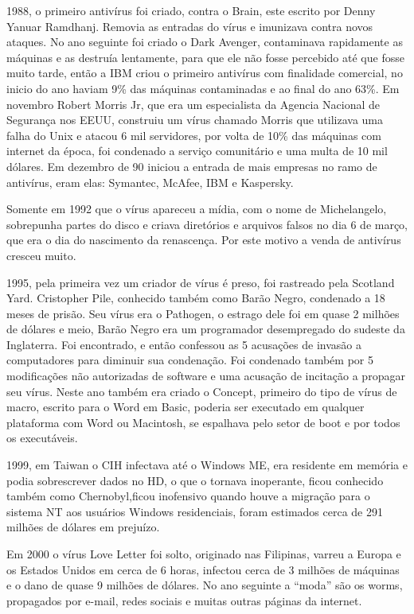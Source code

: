	1988, o primeiro antivírus foi criado, contra o Brain, este escrito por Denny Yanuar Ramdhanj. Removia as entradas do vírus e imunizava contra novos ataques. No ano seguinte foi criado o Dark Avenger, contaminava rapidamente as máquinas e as destruía lentamente, para que ele não fosse percebido até que fosse muito tarde, então a IBM criou o primeiro antivírus com finalidade comercial, no inicio do ano haviam 9\% das máquinas contaminadas e ao final do ano 63\%. Em novembro Robert Morris Jr, que era um especialista da Agencia Nacional de Segurança nos EEUU, construiu um vírus chamado Morris que utilizava uma falha do Unix e atacou 6 mil servidores, por volta de 10\% das máquinas com internet da época, foi condenado a serviço comunitário e uma multa de 10 mil dólares. Em dezembro de 90 iniciou a entrada de mais empresas no ramo de antivírus, eram elas: Symantec, McAfee, IBM e Kaspersky.


	Somente em 1992 que o vírus apareceu a mídia, com o nome de Michelangelo, sobrepunha partes do disco e criava diretórios e arquivos falsos no dia 6 de março, que era o dia do nascimento da renascença. Por este motivo a venda de antivírus cresceu muito.


	1995, pela primeira vez um criador de vírus é preso, foi rastreado pela Scotland Yard. Cristopher Pile, conhecido também como Barão Negro, condenado a 18 meses de prisão. Seu vírus era o Pathogen, o estrago dele foi em quase 2 milhões de dólares e meio, Barão Negro era um programador desempregado do sudeste da Inglaterra. Foi encontrado, e então confessou as 5 acusações de invasão a computadores para diminuir sua condenação. Foi condenado também por 5 modificações não autorizadas de software e uma acusação de incitação a propagar seu vírus. Neste ano também era criado o Concept, primeiro do tipo de vírus de macro, escrito para o Word em Basic, poderia ser executado em qualquer plataforma com Word ou Macintosh, se espalhava pelo setor de boot e por todos os executáveis.


	1999, em Taiwan  o CIH infectava até o Windows ME, era residente em memória e podia sobrescrever dados no HD, o que o tornava inoperante, ficou conhecido também como Chernobyl,ficou inofensivo quando houve a migração para o sistema NT aos usuários Windows residenciais, foram estimados cerca de 291 milhões de dólares em prejuízo.


	Em 2000 o vírus Love Letter foi solto, originado nas Filipinas, varreu a Europa e os Estados Unidos em cerca de 6 horas, infectou cerca de 3 milhões de máquinas e o dano de quase 9 milhões de dólares. No ano seguinte a “moda” são os worms, propagados por e-mail, redes sociais e muitas outras páginas da internet.


